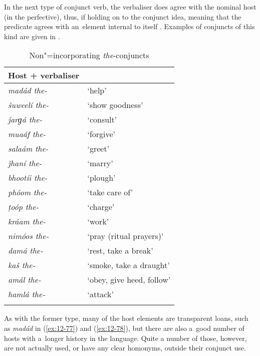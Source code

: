  In the next type of conjunct verb, the verbaliser does agree with the nominal host (in the perfective), thus, if holding on to the conjunct idea, meaning that the predicate agrees with an~element internal to itself \citep[168]{mohanan1993}. Examples of conjuncts of this kind are given in .


\begin{table}[ht]
\caption{Non"=incorporating \textit{the}-conjuncts}
\begin{tabularx}{.75\textwidth}{ l@{\hspace{45pt}} Q} 
\lsptoprule
Host + verbaliser &
\\\hline
\textit{madád the-} &
`help'\\
\textit{šuweelí the-} &
`show goodness'\\
\textit{ǰarɡá the-} &
`consult'\\
\textit{muaáf the-} &
`forgive'\\
\textit{salaám the-} &
`greet'\\
\textit{ǰhaní the-} &
`marry'\\
\textit{bhootíi the-} &
`plough'\\
\textit{phóom the-} &
`take care of'\\
\textit{ṭoóp the-} &
`charge'\\
\textit{kráam the-} &
`work'\\
\textit{nimóos the-} &
`pray (ritual prayers)'\\
\textit{damá the-} &
`rest, take a break'\\
\textit{kaš the-} &
`smoke, take a draught'\\
\textit{amál the-} &
`obey, give heed, follow'\\
\textit{hamlá the-} &
`attack'\\\lspbottomrule
\end{tabularx}
\label{tab:12-4}
\end{table}


As with the former type, many of the host elements are transparent loans, such as \textit{madád} in (\ref{ex:12-77}) and (\ref{ex:12-78}), but there are also a~good number of hosts with a~longer history in the language. Quite a number of those, however, are not actually used, or have any clear homonyms, outside their conjunct use.

